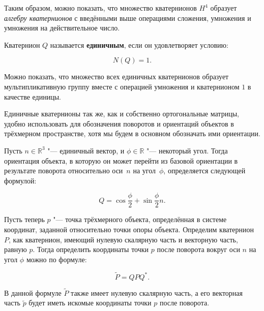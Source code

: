 Таким образом, можно показать, что множество кватернионов $H^4$ образует \textit{алгебру кватернионов} с введёнными
выше операциями сложения, умножения и умножения на действительное число.

\begin{definition}
Кватернион $Q$ называется \textbf{единичным}, если он удовлетворяет условию:

$$
N(Q)=1.
$$
\end{definition}

Можно показать, что множество всех единичных кватернионов образует мультипликативную группу вместе с операцией
умножения и кватернионом $1$ в качестве единицы.

Единичные кватернионы так же, как и собственно ортогональные матрицы, удобно использовать для обозначения поворотов и
ориентаций объектов в трёхмерном пространстве, хотя мы будем в основном обозначать ими ориентации.

Пусть $n \in \mathbb{R}^3$ "--- единичный вектор, и $\phi \in \mathbb{R}$ "--- некоторый угол. Тогда ориентация
объекта, в которую он может перейти из базовой ориентации в результате поворота относительно оси~$n$ на угол~$\phi$,
определяется следующей формулой:

$$
Q=\cos\frac{\phi}{2}+\sin\frac{\phi}{2}n.
$$

Пусть теперь $p$ "--- точка трёхмерного объекта, определённая в системе координат, заданной относительно точки опоры
объекта. Определим кватернион $P$, как кватернион, имеющий нулевую скалярную часть и векторную часть, равную $p$.
Тогда определить координаты точки $p$ после поворота вокруг оси $n$ на угол $\phi$ можно по формуле:

$$
\tilde P=QPQ^*.
$$

В данной формуле $\tilde P$ также имеет нулевую скалярную часть, а его векторная часть $\tilde p$ будет иметь искомые
координаты точки $p$ после поворота.
